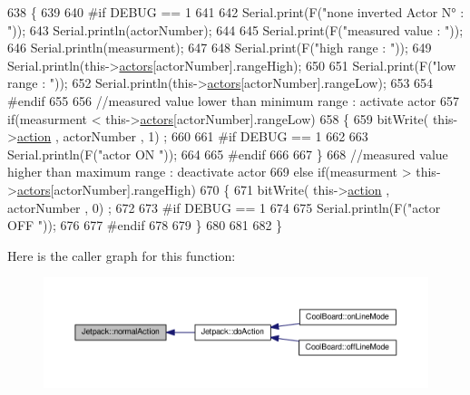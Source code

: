 \begin{DoxyCode}
638 \{
639 
640 \textcolor{preprocessor}{#if DEBUG == 1}
641     
642     Serial.print(F(\textcolor{stringliteral}{"none inverted Actor N° : "}));
643     Serial.println(actorNumber);
644 
645     Serial.print(F(\textcolor{stringliteral}{"measured value : "}));
646     Serial.println(measurment);
647 
648     Serial.print(F(\textcolor{stringliteral}{"high range : "}));
649     Serial.println(this->\hyperlink{class_jetpack_a7e16d2f97837f9712a2e6de1c50d99db}{actors}[actorNumber].rangeHigh);
650 
651     Serial.print(F(\textcolor{stringliteral}{"low range : "}));
652     Serial.println(this->\hyperlink{class_jetpack_a7e16d2f97837f9712a2e6de1c50d99db}{actors}[actorNumber].rangeLow);
653 
654 \textcolor{preprocessor}{#endif}
655 
656     \textcolor{comment}{//measured value lower than minimum range : activate actor}
657     \textcolor{keywordflow}{if}(measurment < this->\hyperlink{class_jetpack_a7e16d2f97837f9712a2e6de1c50d99db}{actors}[actorNumber].rangeLow)
658     \{
659         bitWrite( this->\hyperlink{class_jetpack_aca3142925a7b0834b34ae91d26af7765}{action} , actorNumber , 1) ;
660 
661 \textcolor{preprocessor}{    #if DEBUG == 1 }
662 
663         Serial.println(F(\textcolor{stringliteral}{"actor ON "}));
664     
665 \textcolor{preprocessor}{    #endif}
666                 
667     \}
668     \textcolor{comment}{//measured value higher than maximum range : deactivate actor}
669     \textcolor{keywordflow}{else} \textcolor{keywordflow}{if}(measurment > this->\hyperlink{class_jetpack_a7e16d2f97837f9712a2e6de1c50d99db}{actors}[actorNumber].rangeHigh)
670     \{
671         bitWrite( this->\hyperlink{class_jetpack_aca3142925a7b0834b34ae91d26af7765}{action} , actorNumber , 0) ;
672 
673 \textcolor{preprocessor}{    #if DEBUG == 1 }
674 
675         Serial.println(F(\textcolor{stringliteral}{"actor OFF "}));
676     
677 \textcolor{preprocessor}{    #endif}
678     
679     \}
680 
681 
682 \}
\end{DoxyCode}
Here is the caller graph for this function\+:\nopagebreak
\begin{figure}[H]
\begin{center}
\leavevmode
\includegraphics[width=350pt]{df/d1d/class_jetpack_a65ce9533c39fa71e4945b970bf14b980_icgraph}
\end{center}
\end{figure}
\mbox{\label{class_jetpack_ac54a7bb4f9166bee32052253d9b1d306}} 
